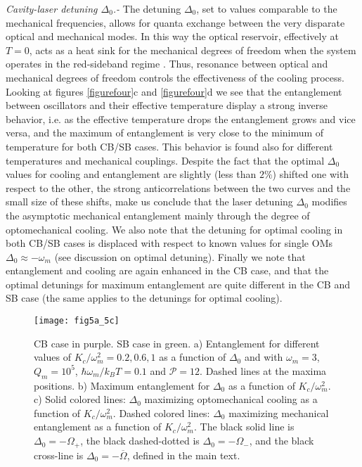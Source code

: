 \documentclass[a4paper]{jpconf}
\begin{document}
{\it Cavity-laser detuning $\Delta_0$.-} The detuning $\Delta_0$,  
set to values comparable to the mechanical frequencies, allows for quanta exchange between
the very disparate optical and mechanical modes. 
In this way the optical reservoir, effectively at $T=0$, acts as a heat sink for the mechanical 
degrees of freedom when the system operates in the red-sideband regime \cite{15,16}. Thus, resonance between optical and mechanical
degrees of freedom controls the effectiveness of the cooling process.  Looking at figures \ref{figurefour}c and \ref{figurefour}d we see that the entanglement
between oscillators and their effective temperature display a strong inverse behavior, i.e. as the effective temperature drops 
the entanglement grows and vice versa, and the maximum of entanglement is very close to the minimum of
temperature for both CB/SB cases. This behavior is found also for different temperatures and mechanical couplings.
Despite the fact that the optimal $\Delta_0$ values for cooling and entanglement
are slightly (less than $2\%$) shifted one with respect to the other, 
the strong anticorrelations between the two curves and the small size of these shifts, 
make us conclude
that the laser detuning $\Delta_0$ modifies the asymptotic mechanical entanglement mainly through the degree of optomechanical cooling.
We also note that the detuning for optimal cooling in both CB/SB cases is displaced with 
respect to known values for single OMs
$\Delta_0\approx-\omega_m$ \cite{15,16} (see discussion on optimal detuning). 
Finally we note that entanglement and cooling are again enhanced in the CB case, and that the optimal detunings for maximum entanglement are quite
different in the CB and SB case (the same applies to the detunings for optimal cooling). 
 
\begin{figure}[b!]
 \centering
 \texttt{[image: fig5a\_5c]}
 \caption{\label{figurefive} CB case in purple. SB case in green.  a) Entanglement for different values of $K_c/\omega_m^2=0.2,0.6,1$ as a function of $\Delta_0$ and with $\omega_m=3$, 
$Q_m=10^5$, $\hbar\omega_m/k_BT=0.1$ and $\mathcal{P}=12$.  Dashed lines at the maxima positions. b) Maximum 
entanglement for $\Delta_0$ as a function of $K_c/\omega_m^2$.  c) Solid colored lines: $\Delta_0$ maximizing optomechanical cooling as a function of $K_c/\omega_m^2$. 
 Dashed colored lines: $\Delta_0$ maximizing mechanical entanglement as a function of $K_c/\omega_m^2$.
The black solid line is $\Delta_0=-\Omega_+$, the black dashed-dotted is 
$\Delta_0=-\Omega_-$, and the black cross-line is $\Delta_0=-\overline{\Omega}$, 
defined in the main text.}
\end{figure}
\end{document}
